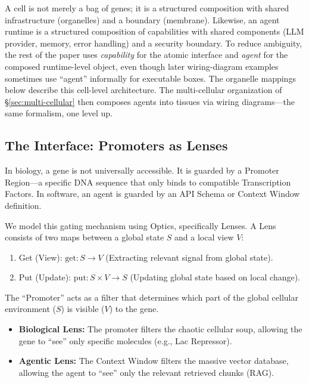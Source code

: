 \noindent A cell is not merely a bag of genes; it is a structured composition with shared infrastructure (organelles) and a boundary (membrane). Likewise, an agent runtime is a structured composition of capabilities with shared components (LLM provider, memory, error handling) and a security boundary. To reduce ambiguity, the rest of the paper uses \textit{capability} for the atomic interface and \textit{agent} for the composed runtime-level object, even though later wiring-diagram examples sometimes use ``agent'' informally for executable boxes. The organelle mappings below describe this cell-level architecture. The multi-cellular organization of \S\ref{sec:multi-cellular} then composes agents into tissues via wiring diagrams---the same formalism, one level up.

\subsection{The Interface: Promoters as Lenses}

In biology, a gene is not universally accessible. It is guarded by a Promoter Region---a specific DNA sequence
that only binds to compatible Transcription Factors. In software, an agent is guarded by an API Schema or
Context Window definition.

We model this gating mechanism using Optics, specifically Lenses. A Lens consists of two maps between a global
state $S$ and a local view $V$:
\begin{enumerate}[leftmargin=*]
\item Get (View): $\mathrm{get}: S \to V$ (Extracting relevant signal from global state).
\item Put (Update): $\mathrm{put}: S\times V \to S$ (Updating global state based on local change).
\end{enumerate}

The ``Promoter'' acts as a filter that determines which part of the global cellular environment ($S$) is visible
($V$) to the gene.
\begin{itemize}[leftmargin=*]
\item \textbf{Biological Lens:} The promoter filters the chaotic cellular soup, allowing the gene to ``see''
only specific molecules (e.g., Lac Repressor).
\item \textbf{Agentic Lens:} The Context Window filters the massive vector database, allowing the agent to
``see'' only the relevant retrieved chunks (RAG).
\end{itemize}

